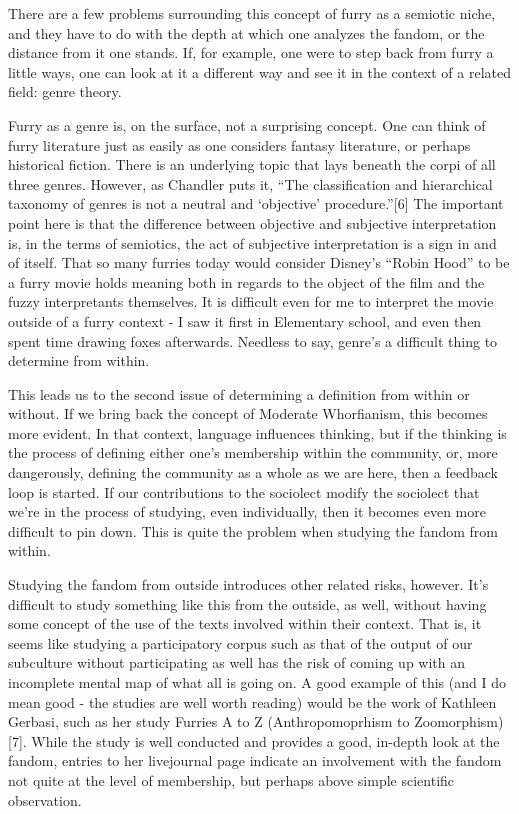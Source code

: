 There are a few problems surrounding this concept of furry as a semiotic
niche, and they have to do with the depth at which one analyzes the
fandom, or the distance from it one stands. If, for example, one were to
step back from furry a little ways, one can look at it a different way
and see it in the context of a related field: genre theory.

Furry as a genre is, on the surface, not a surprising concept. One can
think of furry literature just as easily as one considers fantasy
literature, or perhaps historical fiction. There is an underlying topic
that lays beneath the corpi of all three genres. However, as Chandler
puts it, ``The classification and hierarchical taxonomy of genres is not
a neutral and `objective' procedure.''{[}6{]} The important point here
is that the difference between objective and subjective interpretation
is, in the terms of semiotics, the act of subjective interpretation is a
sign in and of itself. That so many furries today would consider
Disney's ``Robin Hood'' to be a furry movie holds meaning both in
regards to the object of the film and the fuzzy interpretants
themselves. It is difficult even for me to interpret the movie outside
of a furry context - I saw it first in Elementary school, and even then
spent time drawing foxes afterwards. Needless to say, genre's a
difficult thing to determine from within.

This leads us to the second issue of determining a definition from
within or without. If we bring back the concept of Moderate Whorfianism,
this becomes more evident. In that context, language influences
thinking, but if the thinking is the process of defining either one's
membership within the community, or, more dangerously, defining the
community as a whole as we are here, then a feedback loop is started. If
our contributions to the sociolect modify the sociolect that we're in
the process of studying, even individually, then it becomes even more
difficult to pin down. This is quite the problem when studying the
fandom from within.

Studying the fandom from outside introduces other related risks,
however. It's difficult to study something like this from the outside,
as well, without having some concept of the use of the texts involved
within their context. That is, it seems like studying a participatory
corpus such as that of the output of our subculture without
participating as well has the risk of coming up with an incomplete
mental map of what all is going on. A good example of this (and I do
mean good - the studies are well worth reading) would be the work of
Kathleen Gerbasi, such as her study Furries A to Z (Anthropomoprhism to
Zoomorphism){[}7{]}. While the study is well conducted and provides a
good, in-depth look at the fandom, entries to her livejournal page
indicate an involvement with the fandom not quite at the level of
membership, but perhaps above simple scientific observation.

